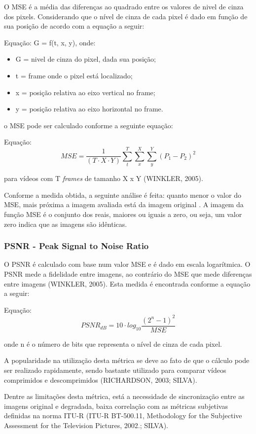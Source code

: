O MSE é a média das diferenças ao quadrado entre os valores de nivel de cinza dos pixels. Considerando que o nível de cinza de cada pixel é dado em função de sua posição de acordo com a equação a seguir:

Equação: G = f(t, x, y), onde:

\begin{itemize}
	\item G = nivel de cinza do pixel, dada sua posição;
	\item t = frame onde o pixel está localizado;
	\item x = posição relativa ao eixo vertical no frame;
	\item y = posição relativa ao eixo horizontal no frame.
\end{itemize}

o MSE pode ser calculado conforme a seguinte equação:

    Equação: \[MSE = \frac{1}{\left (T \cdot X \cdot Y \right )} \sum_{t}^{T} \sum_{x}^{X} \sum_{y}^{Y} \left ( P_{1} - P_{2} \right )^{2}\]

para vídeos com T \emph{frames} de tamanho X x Y (WINKLER, 2005).

    Conforme a medida obtida, a seguinte análise é feita: quanto menor o valor do MSE, mais próxima a imagem avaliada está da imagem original \cite{albini}. A imagem da função MSE é o conjunto dos reais, maiores ou iguais a zero, ou seja, um valor zero indica que as imagens são idênticas.

\subsubsection[PSNR]{PSNR - Peak Signal to Noise Ratio}
O PSNR é calculado com base num valor MSE e é dado em escala logarítmica. O PSNR mede a fidelidade entre imagens, ao contrário do MSE que mede diferenças entre imagens (WINKLER, 2005). Esta medida é encontrada conforme a equação a seguir:

Equação: \[PSNR_{dB} = 10 \cdot log_{10} \frac{{\left(2^{n} -1 \right )}^{2}}{MSE}\]

onde n é o número de bits que representa o nível de cinza de cada pixel.

A popularidade na utilização desta métrica se deve ao fato de que o cálculo pode ser realizado rapidamente, sendo bastante utilizado para comparar vídeos comprimidos e descomprimidos (RICHARDSON, 2003; SILVA).

Dentre as limitações desta métrica, está a necessidade de sincronização entre as imagens original e degradada, baixa correlação com as métricas subjetivas definidas na norma ITU-R (ITU-R BT-500.11, Methodology for the Subjective Assessment for the Television Pictures, 2002.; SILVA).

